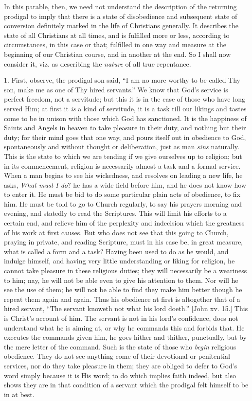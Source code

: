 In this parable, then, we need not understand the description of
the returning prodigal to imply that there is a state of disobedience
and subsequent state of conversion definitely marked in the life
of Christians generally. It describes the state of all Christians at
all times, and is fulfilled more or less, according to circumstances,
in this case or that; fulfilled in one way and measure at the
beginning of our Christian course, and in another at the end. So I
shall now consider it, viz. as describing the \emph{nature} of all
true repentance.

1. First, observe, the prodigal son said, ``I am no more worthy
to be called Thy son, make me as one of Thy hired servants.'' We
know that God's service is perfect freedom, not a servitude; but this
it is in the case of those who have long served Him; at first it \emph{is}
a kind of servitude, it is a task till our likings and tastes come to
be in unison with those which God has sanctioned. It is the happiness
of Saints and Angels in heaven to take pleasure in their duty, and
nothing but their duty; for their mind goes that one way, and pours
itself out in obedience to God, spontaneously and without thought or
deliberation, just as man \emph{sins} naturally. This is the state to
which we are tending if we give ourselves up to religion; but in its
commencement, religion is necessarily almost a task and a formal
service. When a man begins to see his wickedness, and resolves on
leading a new life, he asks, \emph{What must I do}? he has a wide
field before him, and he does not know how to enter it. He must be bid
to do some particular plain acts of obedience, to fix him. He must be
told to go to Church regularly, to say his prayers morning and
evening, and statedly to read the Scriptures. This will limit his
efforts to a certain end, and relieve him of the perplexity and
indecision which the greatness of his work at first causes. But who
does not see that this going to Church, praying in private, and
reading Scripture, must in his case be, in great measure, what is
called a form and a task? Having been used to do as he would, and
indulge himself, and having very little understanding or liking for
religion, he cannot take pleasure in these religious duties; they will
necessarily be a weariness to him; nay, he will not be able even to
give his attention to them. Nor will he see the use of them; he will
not be able to find they make him better though he repeat them again
and again. Thus his obedience at first is altogether that of a hired
servant, ``The servant knoweth not what his lord doeth.''
[John xv. 15.] This is Christ's account of him. The servant is not in
his lord's confidence, does not understand what he is aiming at, or
why he commands this and forbids that. He executes the commands given
him, he goes hither and thither, punctually, but by the mere letter of
the command. Such is the state of those who \emph{begin} religious
obedience. They do not see anything come of their devotional or
penitential services, nor do they take pleasure in them; they are
obliged to defer to God's word simply because it is His word; to do
which implies faith indeed, but also shows they are in that condition
of a servant which the prodigal felt himself to be in at best.

